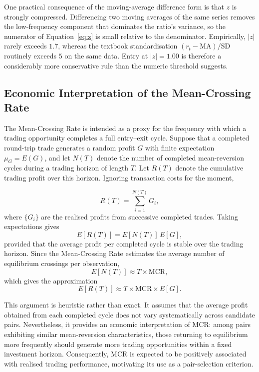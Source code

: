 \documentclass[11pt,a4paper]{article}
\theoremstyle{definition}
\begin{document}
One practical consequence of the moving-average difference form is that $z$ is
strongly compressed. Differencing two moving averages of the same series removes
the low-frequency component that dominates the ratio's variance, so the
numerator of Equation~\eqref{eq:z} is small relative to the denominator.
Empirically, $|z|$ rarely exceeds $1.7$, whereas the textbook standardisation
$(r_t - \mathrm{MA})/\mathrm{SD}$ routinely exceeds $5$ on the same data. Entry
at $|z| = 1.00$ is therefore a considerably more conservative rule than the
numeric threshold suggests.

\subsection{Economic Interpretation of the Mean-Crossing Rate}

The Mean-Crossing Rate is intended as a proxy for the frequency with which a trading opportunity completes a full entry--exit cycle. Suppose that a completed round-trip trade generates a random profit $G$ with
finite expectation $\mu_G=E(G)$, and let $N(T)$ denote the number of completed
mean-reversion cycles during a trading horizon of length $T$. Let $R(T)$ denote
the cumulative trading profit over this horizon. Ignoring transaction costs for
the moment,

\begin{equation}
R(T)=\sum_{i=1}^{N(T)} G_i,
\end{equation}
where $\{G_i\}$ are the realised profits from successive completed trades. Taking expectations gives \begin{equation}
E[R(T)] = E[N(T)]\,E[G],
\end{equation}
provided that the average profit per completed cycle is stable over the trading horizon. Since the Mean-Crossing Rate estimates the average number of equilibrium crossings per observation,
\begin{equation}
E[N(T)] \approx T \times \mathrm{MCR},
\end{equation} which gives the approximation
\begin{equation}
E[R(T)] \approx T \times \mathrm{MCR}\times E[G].
\end{equation}

This argument is heuristic rather than exact. It assumes that the average profit obtained
from each completed cycle does not vary systematically across candidate pairs.
Nevertheless, it provides an economic interpretation of MCR: among pairs exhibiting
similar mean-reversion characteristics, those returning to equilibrium more frequently
should generate more trading opportunities within a fixed investment horizon.
Consequently, MCR is expected to be positively associated with realised trading
performance, motivating its use as a pair-selection criterion.
\end{document}
